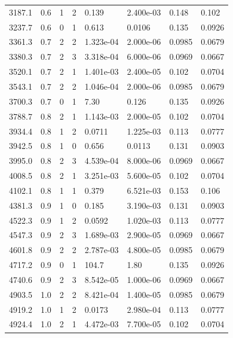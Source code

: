 \documentclass[preview]{standalone}
\begin{document}
{{{\begin{tabular}{L{1.2cm}C{1.2cm} C{0.3cm}C{0.5cm} C{1.4cm}C{1.4cm} C{1.4cm}C{1.4cm}}
  3187.1  &   0.6  & 1     &  2 &  0.139  & 2.400e-03  & 0.148 &  0.102   \\ 
  3237.7  &   0.6  & 0     &  1 &  0.613  & 0.0106  & 0.135 &  0.0926   \\ 
  3361.3  &   0.7  & 2     &  2 &  1.323e-04  & 2.000e-06  & 0.0985 &  0.0679   \\ 
  3380.3  &   0.7  & 2     &  3 &  3.318e-04  & 6.000e-06  & 0.0969 &  0.0667   \\ 
  3520.1  &   0.7  & 2     &  1 &  1.401e-03  & 2.400e-05  & 0.102 &  0.0704   \\ 
  3543.1  &   0.7  & 2     &  2 &  1.046e-04  & 2.000e-06  & 0.0985 &  0.0679   \\ 
  3700.3  &   0.7  & 0     &  1 &  7.30  & 0.126  & 0.135 &  0.0926   \\ 
  3788.7  &   0.8  & 2     &  1 &  1.143e-03  & 2.000e-05  & 0.102 &  0.0704   \\ 
  3934.4  &   0.8  & 1     &  2 &  0.0711  & 1.225e-03  & 0.113 &  0.0777   \\ 
  3942.5  &   0.8  & 1     &  0 &  0.656  & 0.0113  & 0.131 &  0.0903   \\ 
  3995.0  &   0.8  & 2     &  3 &  4.539e-04  & 8.000e-06  & 0.0969 &  0.0667   \\ 
  4008.5  &   0.8  & 2     &  1 &  3.251e-03  & 5.600e-05  & 0.102 &  0.0704   \\ 
  4102.1  &   0.8  & 1     &  1 &  0.379  & 6.521e-03  & 0.153 &  0.106   \\ 
  4381.3  &   0.9  & 1     &  0 &  0.185  & 3.190e-03  & 0.131 &  0.0903   \\ 
  4522.3  &   0.9  & 1     &  2 &  0.0592  & 1.020e-03  & 0.113 &  0.0777   \\ 
  4547.3  &   0.9  & 2     &  3 &  1.689e-03  & 2.900e-05  & 0.0969 &  0.0667   \\ 
  4601.8  &   0.9  & 2     &  2 &  2.787e-03  & 4.800e-05  & 0.0985 &  0.0679   \\ 
  4717.2  &   0.9  & 0     &  1 &  104.7  & 1.80  & 0.135 &  0.0926   \\ 
  4740.6  &   0.9  & 2     &  3 &  8.542e-05  & 1.000e-06  & 0.0969 &  0.0667   \\ 
  4903.5  &   1.0  & 2     &  2 &  8.421e-04  & 1.400e-05  & 0.0985 &  0.0679   \\ 
  4919.2  &   1.0  & 1     &  2 &  0.0173  & 2.980e-04  & 0.113 &  0.0777   \\ 
  4924.4  &   1.0  & 2     &  1 &  4.472e-03  & 7.700e-05  & 0.102 &  0.0704   \\ 

\end{tabular}}}}
\end{document}
